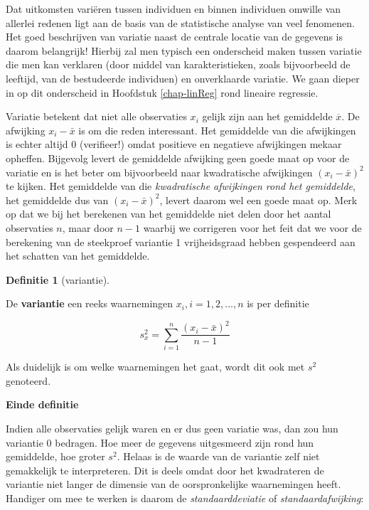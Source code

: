 \documentclass[
  12pt,dutch]{book}
\theoremstyle{definition}
\newtheorem{definition}{Definitie}[chapter]
\theoremstyle{definition}
\theoremstyle{definition}
\theoremstyle{definition}
\theoremstyle{remark}
\begin{document}
Dat uitkomsten variëren tussen individuen en binnen individuen omwille van
allerlei redenen ligt aan de basis van de statistische analyse van veel
fenomenen. Het goed beschrijven van variatie naast de centrale locatie van
de gegevens is daarom belangrijk! Hierbij zal men typisch een
onderscheid maken tussen variatie die men kan verklaren (door middel van
karakteristieken, zoals bijvoorbeeld de leeftijd, van de bestudeerde individuen) en onverklaarde variatie. We gaan
dieper in op dit onderscheid in Hoofdstuk \ref{chap-linReg} rond lineaire regressie.

Variatie betekent dat niet alle observaties \(x_i\) gelijk zijn aan het
gemiddelde \(\overline{x}\). De afwijking \(x_i - \bar{x}\) is om die reden
interessant. Het gemiddelde van die afwijkingen is echter altijd 0
(verifieer!) omdat positieve en negatieve afwijkingen mekaar opheffen.
Bijgevolg levert de gemiddelde afwijking geen goede maat op voor de variatie
en is het beter om bijvoorbeeld naar kwadratische afwijkingen \((x_i - \bar{x})^2\) te kijken. Het gemiddelde van die \emph{kwadratische afwijkingen rond het gemiddelde}, het gemiddelde dus van \((x_i - \bar{x})^2\), levert daarom
wel een goede maat op. Merk op dat we bij het berekenen van het gemiddelde niet delen door het aantal observaties \(n\), maar door \(n-1\) waarbij we corrigeren voor het feit dat we voor de berekening van de steekproef variantie 1 vrijheidsgraad hebben gespendeerd aan het schatten van het gemiddelde.

\begin{definition}[variantie]
\protect\hypertarget{def:unnamed-chunk-101}{}\label{def:unnamed-chunk-101}~
\end{definition}

De \textbf{variantie} een reeks waarnemingen \(x_i, i=1, 2, \dots, n\) is per
definitie

\begin{equation*}
s^2_x = \sum_{i=1}^{n} \frac{(x_i - \bar{x})^2}{n-1}
\end{equation*}

Als duidelijk is om welke waarnemingen het gaat, wordt dit ook met \(s^2\)
genoteerd.

\textbf{Einde definitie}

Indien alle observaties gelijk waren en er dus geen variatie was, dan zou
hun variantie 0 bedragen. Hoe meer de gegevens uitgesmeerd zijn rond hun
gemiddelde, hoe groter \(s^2\). Helaas is de waarde van de variantie zelf niet
gemakkelijk te interpreteren. Dit is deels omdat door het kwadrateren de
variantie niet langer de dimensie van de oorspronkelijke waarnemingen heeft.
Handiger om mee te werken is daarom de \emph{standaarddeviatie} of \emph{
standaardafwijking}:
\end{document}
